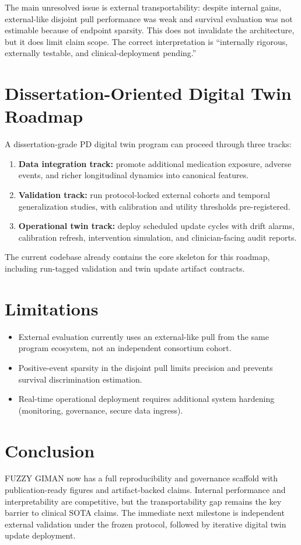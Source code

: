 \documentclass[pdflatex,sn-mathphys-num]{sn-jnl}
\begin{document}
The main unresolved issue is external transportability: despite internal gains, external-like disjoint pull performance was weak and survival evaluation was not estimable because of endpoint sparsity. This does not invalidate the architecture, but it does limit claim scope. The correct interpretation is ``internally rigorous, externally testable, and clinical-deployment pending.''

\section{Dissertation-Oriented Digital Twin Roadmap}
A dissertation-grade PD digital twin program can proceed through three tracks:
\begin{enumerate}
\item \textbf{Data integration track:} promote additional medication exposure, adverse events, and richer longitudinal dynamics into canonical features.
\item \textbf{Validation track:} run protocol-locked external cohorts and temporal generalization studies, with calibration and utility thresholds pre-registered.
\item \textbf{Operational twin track:} deploy scheduled update cycles with drift alarms, calibration refresh, intervention simulation, and clinician-facing audit reports.
\end{enumerate}

The current codebase already contains the core skeleton for this roadmap, including run-tagged validation and twin update artifact contracts.

\section{Limitations}
\begin{itemize}
\item External evaluation currently uses an external-like pull from the same program ecosystem, not an independent consortium cohort.
\item Positive-event sparsity in the disjoint pull limits precision and prevents survival discrimination estimation.
\item Real-time operational deployment requires additional system hardening (monitoring, governance, secure data ingress).
\end{itemize}

\section{Conclusion}
FUZZY GIMAN now has a full reproducibility and governance scaffold with publication-ready figures and artifact-backed claims. Internal performance and interpretability are competitive, but the transportability gap remains the key barrier to clinical SOTA claims. The immediate next milestone is independent external validation under the frozen protocol, followed by iterative digital twin update deployment.
\end{document}
